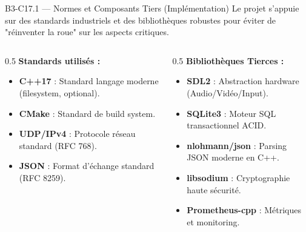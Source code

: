 \documentclass[aspectratio=169,10pt]{beamer}
\begin{document}
\begin{frame}[fragile]{B3-C17.1 — Normes et Composants Tiers (Implémentation)}
  \footnotesize
  Le projet s'appuie sur des standards industriels et des bibliothèques robustes pour éviter de "réinventer la roue" sur les aspects critiques.
  
  \begin{columns}[T]
    \begin{column}{0.5\textwidth}
      \textbf{Standards utilisés :}
      \begin{itemize}
        \item \textbf{C++17} : Standard langage moderne (filesystem, optional).
        \item \textbf{CMake} : Standard de build system.
        \item \textbf{UDP/IPv4} : Protocole réseau standard (RFC 768).
        \item \textbf{JSON} : Format d'échange standard (RFC 8259).
      \end{itemize}
    \end{column}
    \begin{column}{0.5\textwidth}
      \textbf{Bibliothèques Tierces :}
      \begin{itemize}
        \item \textbf{SDL2} : Abstraction hardware (Audio/Vidéo/Input).
        \item \textbf{SQLite3} : Moteur SQL transactionnel ACID.
        \item \textbf{nlohmann/json} : Parsing JSON moderne en C++.
        \item \textbf{libsodium} : Cryptographie haute sécurité.
        \item \textbf{Prometheus-cpp} : Métriques et monitoring.
      \end{itemize}
    \end{column}
  \end{columns}
\end{frame}
\end{document}
